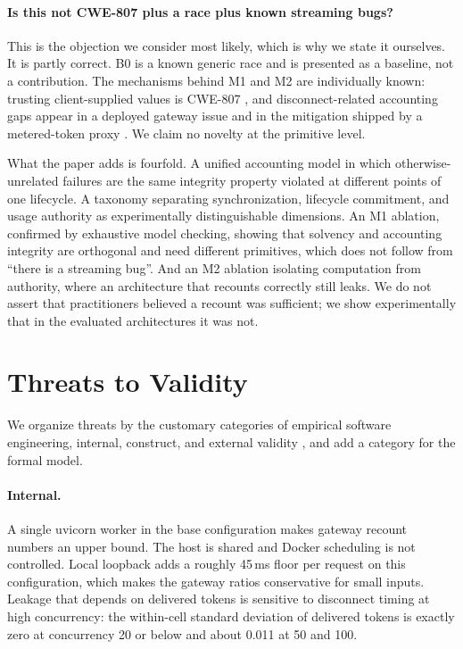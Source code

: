 \documentclass[preprint,3p,authoryear,12pt]{elsarticle}
\begin{document}
\paragraph{Is this not CWE-807 plus a race plus known streaming bugs?}
This is the objection we consider most likely, which is why we state it ourselves. It is
partly correct. B0 is a known generic race and is presented as a baseline, not a
contribution. The mechanisms behind M1 and M2 are individually known: trusting
client-supplied values is CWE-807 \citep{cwe807}, and disconnect-related accounting gaps
appear in a deployed gateway issue \citep{newapi5235} and in the mitigation shipped by a
metered-token proxy \citep{aperture247}. We claim no novelty at the primitive level.

What the paper adds is fourfold. A unified accounting model in which
otherwise-unrelated failures are the same integrity property violated at different
points of one lifecycle. A taxonomy separating synchronization, lifecycle commitment, and
usage authority as experimentally distinguishable dimensions. An M1 ablation, confirmed
by exhaustive model checking, showing that solvency and accounting integrity are
orthogonal and need different primitives, which does not follow from ``there is a
streaming bug''. And an M2 ablation isolating computation from authority, where an
architecture that recounts correctly still leaks. We do not assert that practitioners
believed a recount was sufficient; we show experimentally that in the evaluated
architectures it was not.

\section{Threats to Validity}
\label{sec:limits}
We organize threats by the customary categories of empirical software engineering,
internal, construct, and external validity \citep{runeson,wohlin}, and add a category for
the formal model.

\paragraph{Internal.}
A single uvicorn worker in the base configuration makes gateway recount numbers an upper
bound. The host is shared and Docker scheduling is not controlled. Local loopback adds a
roughly 45\,ms floor per request on this configuration, which makes the gateway ratios
conservative for small inputs. Leakage that depends on delivered tokens is sensitive to
disconnect timing at high concurrency: the within-cell standard deviation of delivered
tokens is exactly zero at concurrency 20 or below and about 0.011 at 50 and 100.
\end{document}
